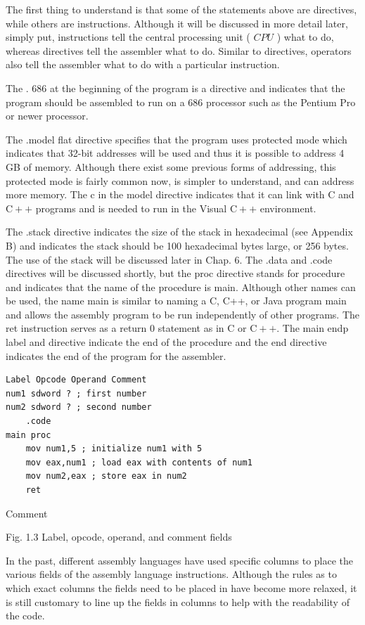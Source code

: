 \documentclass[10pt]{book}
\begin{document}
The first thing to understand is that some of the statements above are directives, while others are instructions. Although it will be discussed in more detail later, simply put, instructions tell the central processing unit ( $C P U$ ) what to do, whereas directives tell the assembler what to do. Similar to directives, operators also tell the assembler what to do with a particular instruction.

The . 686 at the beginning of the program is a directive and indicates that the program should be assembled to run on a 686 processor such as the Pentium Pro or newer processor.

The .model flat directive specifies that the program uses protected mode which indicates that 32-bit addresses will be used and thus it is possible to address 4 GB of memory. Although there exist some previous forms of addressing, this protected mode is fairly common now, is simpler to understand, and can address more memory. The c in the model directive indicates that it can link with C and $\mathrm{C}++$ programs and is needed to run in the Visual $\mathrm{C}++$ environment.

The .stack directive indicates the size of the stack in hexadecimal (see Appendix B) and indicates the stack should be 100 hexadecimal bytes large, or 256 bytes. The use of the stack will be discussed later in Chap. 6. The .data and .code directives will be discussed shortly, but the proc directive stands for procedure and indicates that the name of the procedure is main. Although other names can be used, the name main is similar to naming a C, C++, or Java program main and allows the assembly program to be run independently of other programs. The ret instruction serves as a return 0 statement as in C or $\mathrm{C}++$. The main endp label and directive indicate the end of the procedure and the end directive indicates the end of the program for the assembler.

\begin{verbatim}
Label Opcode Operand Comment
num1 sdword ? ; first number
num2 sdword ? ; second number
    .code
main proc
    mov num1,5 ; initialize num1 with 5
    mov eax,num1 ; load eax with contents of num1
    mov num2,eax ; store eax in num2
    ret
\end{verbatim}

Comment

Fig. 1.3 Label, opcode, operand, and comment fields

In the past, different assembly languages have used specific columns to place the various fields of the assembly language instructions. Although the rules as to which exact columns the fields need to be placed in have become more relaxed, it is still customary to line up the fields in columns to help with the readability of the code.
\end{document}
